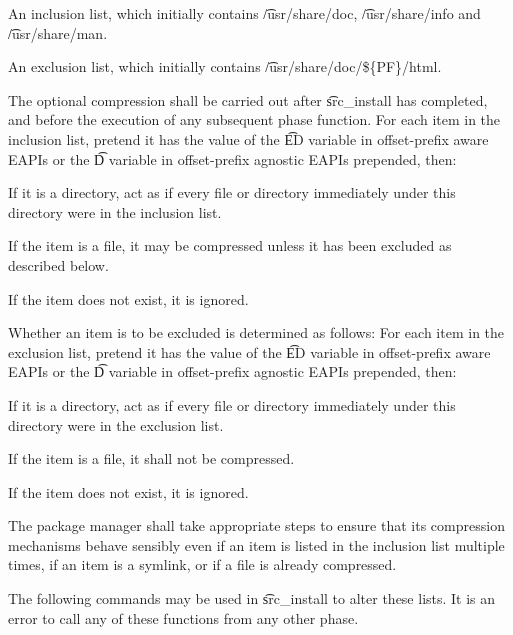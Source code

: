 \begin{compactitem}
\item An inclusion list, which initially contains \t{/usr/share/doc}, \t{/usr/share/info} and
    \t{/usr/share/man}.
\item An exclusion list, which initially contains \t{/usr/share/doc/\$\{PF\}/html}.
\end{compactitem}

The optional compression shall be carried out after \t{src\_install} has completed, and before the
execution of any subsequent phase function. For each item in the inclusion list, pretend it has the
value of the \t{ED} variable in offset-prefix aware EAPIs or the \t{D}
variable in offset-prefix agnostic EAPIs prepended, then:

\begin{compactitem}
\item If it is a directory, act as if every file or directory immediately under this directory
    were in the inclusion list.
\item If the item is a file, it may be compressed unless it has been excluded as described below.
\item If the item does not exist, it is ignored.
\end{compactitem}

Whether an item is to be excluded is determined as follows: For each item in the exclusion list,
pretend it has the value of the \t{ED} variable in offset-prefix aware EAPIs or the \t{D} variable in
offset-prefix agnostic EAPIs prepended, then:

\begin{compactitem}
\item If it is a directory, act as if every file or directory immediately under this directory
    were in the exclusion list.
\item If the item is a file, it shall not be compressed.
\item If the item does not exist, it is ignored.
\end{compactitem}

The package manager shall take appropriate steps to ensure that its compression mechanisms behave
sensibly even if an item is listed in the inclusion list multiple times, if an item is a symlink,
or if a file is already compressed.

The following commands may be used in \t{src\_install} to alter these lists. It is an error to call
any of these functions from any other phase.

